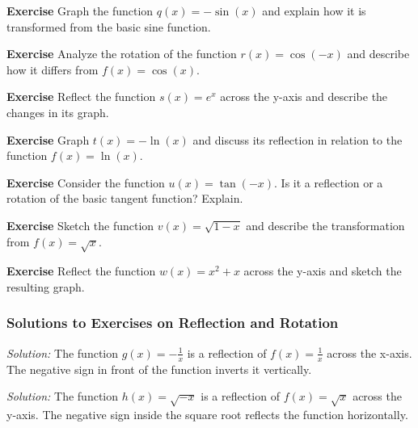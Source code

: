 \documentclass[a4paper,12pt]{book}
\newenvironment{exercise}[1][]
  {\par\medskip\noindent\textbf{Exercise #1} \rmfamily}
  {\medskip}
\newenvironment{solution}[1][]
{\par\noindent\textit{Solution:} \rmfamily}{\medskip}
\begin{document}
\begin{exercise}
Graph the function \( q(x) = -\sin(x) \) and explain how it is transformed from the basic sine function.
\end{exercise}

\begin{exercise}
Analyze the rotation of the function \( r(x) = \cos(-x) \) and describe how it differs from \( f(x) = \cos(x) \).
\end{exercise}

\begin{exercise}
Reflect the function \( s(x) = e^x \) across the y-axis and describe the changes in its graph.
\end{exercise}

\begin{exercise}
Graph \( t(x) = -\ln(x) \) and discuss its reflection in relation to the function \( f(x) = \ln(x) \).
\end{exercise}

\begin{exercise}
Consider the function \( u(x) = \tan(-x) \). Is it a reflection or a rotation of the basic tangent function? Explain.
\end{exercise}

\begin{exercise}
Sketch the function \( v(x) = \sqrt{1 - x} \) and describe the transformation from \( f(x) = \sqrt{x} \).
\end{exercise}

\begin{exercise}
Reflect the function \( w(x) = x^2 + x \) across the y-axis and sketch the resulting graph.
\end{exercise}

\subsubsection*{Solutions to Exercises on Reflection and Rotation}

\begin{solution}[1]
The function \( g(x) = -\frac{1}{x} \) is a reflection of \( f(x) = \frac{1}{x} \) across the x-axis. The negative sign in front of the function inverts it vertically.
\end{solution}

\begin{solution}[2]
The function \( h(x) = \sqrt{-x} \) is a reflection of \( f(x) = \sqrt{x} \) across the y-axis. The negative sign inside the square root reflects the function horizontally.
\end{solution}
\end{document}
